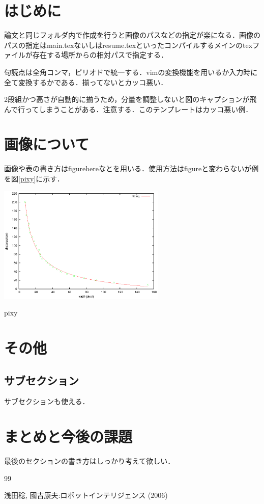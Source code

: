 \documentclass [10pt] {jsarticle}
\begin{document}
\begin{multicols}{2}

\section {はじめに}
論文と同じフォルダ内で作成を行うと画像のパスなどの指定が楽になる．画像のパスの指定はmain.texないしはresume.texといったコンパイルするメインのtexファイルが存在する場所からの相対パスで指定する．\par
句読点は全角コンマ，ピリオドで統一する．vimの変換機能を用いるか入力時に全て変換するかである．揃ってないとカッコ悪い．\par
2段組かつ高さが自動的に揃うため，分量を調整しないと図のキャプションが飛んで行ってしまうことがある．注意する．このテンプレートはカッコ悪い例．

\section{画像について}
画像や表の書き方はfigurehereなとを用いる．使用方法はfigureと変わらないが例を図\ref{pixy}に示す．

\begin{figurehere}
 \begin{center}
  \includegraphics[width=80mm]{appendix/eps/pixy.eps}
  \caption{pixy}
  \label{pixy}
 \end{center}
\end{figurehere}


\section{その他}


\subsection{サブセクション}
サブセクションも使える．



\section{まとめと今後の課題}
最後のセクションの書き方はしっかり考えて欲しい．


\vfill
\begin {thebibliography} {99}
 浅田稔, 國吉康夫:ロボットインテリジェンス (2006)

\end {thebibliography}


\end{multicols}
\end{document}
